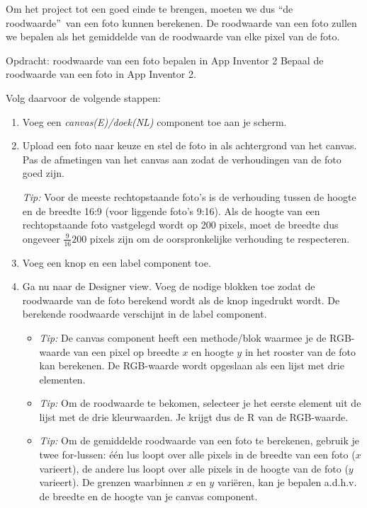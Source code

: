 
Om het project tot een goed einde te brengen, moeten we dus \textquotedblleft de roodwaarde\textquotedblright\  van een foto kunnen berekenen. 
De roodwaarde van een foto zullen we bepalen als het gemiddelde van de roodwaarde van elke pixel van de foto.


\begin{opdracht}{Opdracht: roodwaarde van een foto bepalen in App Inventor 2}
Bepaal de roodwaarde van een foto in App Inventor 2.

Volg daarvoor de volgende stappen:
\begin{enumerate}
	\item Voeg een \emph{canvas(E)/doek(NL)} component toe aan je scherm. 
	\item Upload een foto naar keuze en stel de foto in als achtergrond van het canvas.
	Pas de afmetingen van het canvas aan zodat de verhoudingen van de foto goed zijn. 
	
	\emph{Tip:} Voor de meeste rechtopstaande foto's is de verhouding tussen de hoogte en de breedte 16:9 (voor liggende foto's 9:16). Als de hoogte van een rechtopstaande foto vastgelegd wordt op 200 pixels, moet de breedte dus ongeveer $\frac{9}{16}200$ pixels zijn om de oorspronkelijke verhouding te respecteren.
	 
	\item Voeg een knop en een label component toe.
	
	\item Ga nu naar de Designer view. Voeg de nodige blokken toe zodat de roodwaarde van de foto berekend wordt als de knop ingedrukt wordt. De berekende roodwaarde verschijnt in de label component.
	
	\begin{itemize}
		\item \emph{Tip:} De canvas component heeft een methode/blok waarmee je de RGB-waarde van een pixel op breedte $x$ en hoogte $y$ in het rooster van de foto kan berekenen. De RGB-waarde wordt opgeslaan als een lijst met drie elementen.
		
		\item \emph{Tip:} Om de roodwaarde te bekomen, selecteer je het eerste element uit de lijst met de drie kleurwaarden. Je krijgt dus de R van de RGB-waarde.
		
		\item \emph{Tip:} Om de gemiddelde roodwaarde van een foto te berekenen, gebruik je twee for-lussen: \'e\'en lus loopt over alle pixels in de breedte van een foto ($x$ varieert), de andere lus loopt over alle pixels in de hoogte van de foto ($y$ varieert). De grenzen waarbinnen $x$ en $y$ vari\"eren, kan je bepalen a.d.h.v. de breedte en de hoogte van je canvas component.
		

\end{itemize}
\end{enumerate}
\end{opdracht}
